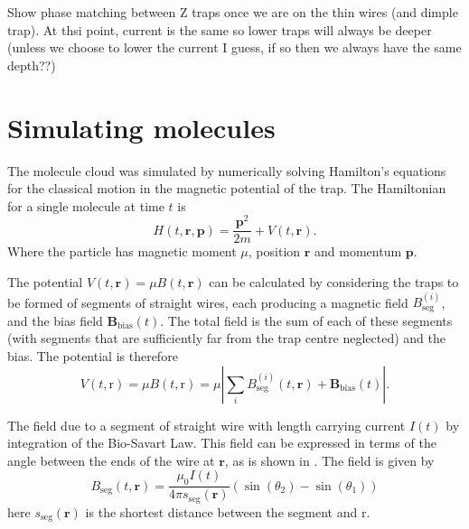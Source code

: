 
Show phase matching between Z traps once we are on the thin wires (and dimple
trap). At thsi point, current is the same so lower traps will always be deeper
(unless we choose to lower the current I guess, if so then we always have the
same depth??)



\section{Simulating molecules}


The molecule cloud was simulated by numerically solving Hamilton's equations
for the classical motion in the magnetic potential of the trap. The Hamiltonian
for a single molecule at time $t$ is
%
\begin{equation}
  H(t, \mathbf{r}, \mathbf{p}) = \frac{\mathbf{p}^2}{2m} + V(t, \mathbf{r}).
\end{equation}
Where the particle has magnetic moment $\mu$, position $\mathbf{r}$ and
momentum $\mathbf{p}$.

The potential $V(t, \mathbf{r}) = \mu B(t, \mathbf{r})$ can be calculated by
considering the traps to be formed of segments of straight wires, each
producing a magnetic field $B_\text{seg}^{(i)}$, and the bias field
$\mathbf{B}_\text{bias}(t)$. The total field is the sum of each of these
segments (with segments that are sufficiently far from the trap centre
neglected) and the bias. The potential is therefore
%
\begin{equation}
  V(t, \mathrm{r}) = \mu B (t, \mathrm{r}) = \mu \left| \sum_i
  B_\text{seg}^{(i)}(t, \mathbf{r}) +
  \mathbf{B}_\text{bias}(t)\right|.
\end{equation}

The field due to a segment of straight wire with length carrying current $I(t)$
 by integration of the Bio-Savart Law.
This field can be expressed in terms of the angle between the ends of the wire
at $\mathbf{r}$, as is shown in . The field
is given by~\cite{Griffiths2017}
%
\begin{equation}
  B_\text{seg}(t, \mathbf{r}) = \frac{\mu_0 I(t)}{4\pi
  s_\text{seg}(\mathbf{r})} (\sin(\theta_2)  - \sin(\theta_1))
\end{equation}
here $s_\text{seg}(\mathbf{r})$ is the shortest distance between the segment
and $\mathrm{r}$.

